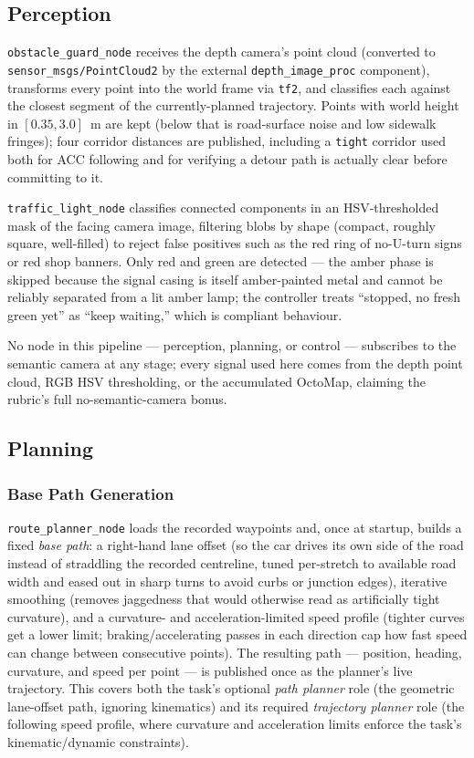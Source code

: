\documentclass[10pt,twocolumn]{article}
\begin{document}
\subsection{Perception}

\texttt{obstacle\_guard\_node} receives the depth camera's point cloud
(converted to \texttt{sensor\_msgs/PointCloud2} by the external
\texttt{depth\_image\_proc} component), transforms every point into the
world frame via \texttt{tf2}, and classifies each against the closest
segment of the currently-planned trajectory. Points with world height in
$[0.35, 3.0]$~m are kept (below that is road-surface noise and low
sidewalk fringes); four corridor distances are published, including a
\texttt{tight} corridor used both for ACC following and for verifying a
detour path is actually clear before committing to it.

\texttt{traffic\_light\_node} classifies connected components in an
HSV-thresholded mask of the facing camera image, filtering blobs by shape
(compact, roughly square, well-filled) to reject false positives such as
the red ring of no-U-turn signs or red shop banners. Only red and green
are detected --- the amber phase is skipped because the signal casing is
itself amber-painted metal and cannot be reliably separated from a lit
amber lamp; the controller treats ``stopped, no fresh green yet'' as
``keep waiting,'' which is compliant behaviour.

No node in this pipeline --- perception, planning, or control ---
subscribes to the semantic camera at any stage; every signal used here
comes from the depth point cloud, RGB HSV thresholding, or the
accumulated OctoMap, claiming the rubric's full no-semantic-camera
bonus.

\subsection{Planning}

\subsubsection{Base Path Generation}
\label{sec:path-generation}

\texttt{route\_planner\_node} loads the recorded waypoints and, once at
startup, builds a fixed \emph{base path}: a right-hand lane offset (so
the car drives its own side of the road instead of straddling the
recorded centreline, tuned per-stretch to available road width and eased
out in sharp turns to avoid curbs or junction edges), iterative smoothing
(removes jaggedness that would otherwise read as artificially tight
curvature), and a curvature- and acceleration-limited speed profile
(tighter curves get a lower limit; braking/accelerating passes in each
direction cap how fast speed can change between consecutive points). The
resulting path --- position, heading, curvature, and speed per point ---
is published once as the planner's live trajectory. This covers both
the task's optional \emph{path planner} role (the geometric lane-offset
path, ignoring kinematics) and its required \emph{trajectory planner}
role (the following speed profile, where curvature and acceleration
limits enforce the task's kinematic/dynamic constraints).
\end{document}
